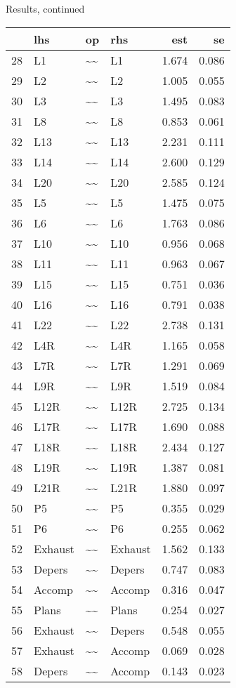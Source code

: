 \documentclass[10pt,ignorenonframetext,]{beamer}
\begin{document}
\begin{frame}{Results, continued}

\tiny

\begin{longtable}[]{@{}llllrr@{}}
\toprule
& lhs & op & rhs & est & se\tabularnewline
\midrule
\endhead
28 & L1 & \textasciitilde{}\textasciitilde{} & L1 & 1.674 &
0.086\tabularnewline
29 & L2 & \textasciitilde{}\textasciitilde{} & L2 & 1.005 &
0.055\tabularnewline
30 & L3 & \textasciitilde{}\textasciitilde{} & L3 & 1.495 &
0.083\tabularnewline
31 & L8 & \textasciitilde{}\textasciitilde{} & L8 & 0.853 &
0.061\tabularnewline
32 & L13 & \textasciitilde{}\textasciitilde{} & L13 & 2.231 &
0.111\tabularnewline
33 & L14 & \textasciitilde{}\textasciitilde{} & L14 & 2.600 &
0.129\tabularnewline
34 & L20 & \textasciitilde{}\textasciitilde{} & L20 & 2.585 &
0.124\tabularnewline
35 & L5 & \textasciitilde{}\textasciitilde{} & L5 & 1.475 &
0.075\tabularnewline
36 & L6 & \textasciitilde{}\textasciitilde{} & L6 & 1.763 &
0.086\tabularnewline
37 & L10 & \textasciitilde{}\textasciitilde{} & L10 & 0.956 &
0.068\tabularnewline
38 & L11 & \textasciitilde{}\textasciitilde{} & L11 & 0.963 &
0.067\tabularnewline
39 & L15 & \textasciitilde{}\textasciitilde{} & L15 & 0.751 &
0.036\tabularnewline
40 & L16 & \textasciitilde{}\textasciitilde{} & L16 & 0.791 &
0.038\tabularnewline
41 & L22 & \textasciitilde{}\textasciitilde{} & L22 & 2.738 &
0.131\tabularnewline
42 & L4R & \textasciitilde{}\textasciitilde{} & L4R & 1.165 &
0.058\tabularnewline
43 & L7R & \textasciitilde{}\textasciitilde{} & L7R & 1.291 &
0.069\tabularnewline
44 & L9R & \textasciitilde{}\textasciitilde{} & L9R & 1.519 &
0.084\tabularnewline
45 & L12R & \textasciitilde{}\textasciitilde{} & L12R & 2.725 &
0.134\tabularnewline
46 & L17R & \textasciitilde{}\textasciitilde{} & L17R & 1.690 &
0.088\tabularnewline
47 & L18R & \textasciitilde{}\textasciitilde{} & L18R & 2.434 &
0.127\tabularnewline
48 & L19R & \textasciitilde{}\textasciitilde{} & L19R & 1.387 &
0.081\tabularnewline
49 & L21R & \textasciitilde{}\textasciitilde{} & L21R & 1.880 &
0.097\tabularnewline
50 & P5 & \textasciitilde{}\textasciitilde{} & P5 & 0.355 &
0.029\tabularnewline
51 & P6 & \textasciitilde{}\textasciitilde{} & P6 & 0.255 &
0.062\tabularnewline
52 & Exhaust & \textasciitilde{}\textasciitilde{} & Exhaust & 1.562 &
0.133\tabularnewline
53 & Depers & \textasciitilde{}\textasciitilde{} & Depers & 0.747 &
0.083\tabularnewline
54 & Accomp & \textasciitilde{}\textasciitilde{} & Accomp & 0.316 &
0.047\tabularnewline
55 & Plans & \textasciitilde{}\textasciitilde{} & Plans & 0.254 &
0.027\tabularnewline
56 & Exhaust & \textasciitilde{}\textasciitilde{} & Depers & 0.548 &
0.055\tabularnewline
57 & Exhaust & \textasciitilde{}\textasciitilde{} & Accomp & 0.069 &
0.028\tabularnewline
58 & Depers & \textasciitilde{}\textasciitilde{} & Accomp & 0.143 &
0.023\tabularnewline
\bottomrule
\end{longtable}

\end{frame}
\end{document}
